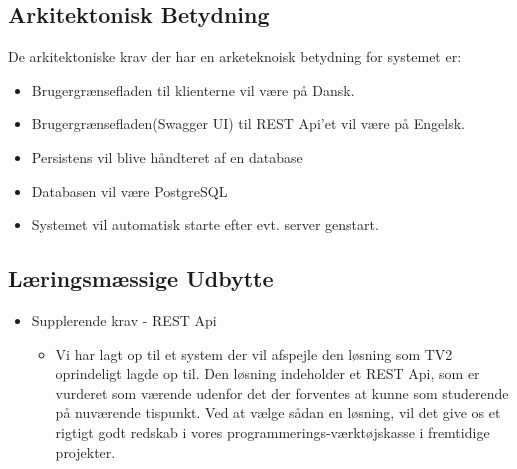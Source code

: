 \subsection{Arkitektonisk Betydning}

\noindent
De arkitektoniske krav der har en arketeknoisk betydning for systemet er:
\begin{itemize}
    \item Brugergrænsefladen til klienterne vil være på Dansk.
    \item Brugergrænsefladen(Swagger UI) til REST Api'et vil være på Engelsk.
    \item Persistens vil blive håndteret af en database
    \item Databasen vil være PostgreSQL
    \item Systemet vil automatisk starte efter evt. server genstart.
\end{itemize}



\subsection{Læringsmæssige Udbytte}
\begin{itemize}
    \item Supplerende krav - REST Api
    \begin{itemize}
        \item Vi har lagt op til et system der vil afspejle den løsning som TV2 oprindeligt lagde op til. Den løsning indeholder et REST Api, som er vurderet som værende udenfor det der forventes at kunne som studerende på nuværende tispunkt. Ved at vælge sådan en løsning, vil det give os et rigtigt godt redskab i vores programmerings-værktøjskasse i fremtidige projekter.
    \end{itemize}{}
\end{itemize}


